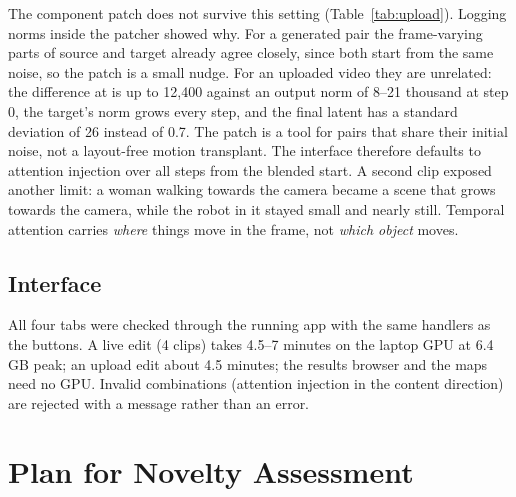 \documentclass[twoside,english]{article}
\begin{document}
The component patch does not survive this setting (Table~\ref{tab:upload}). Logging norms inside the
patcher showed why. For a generated pair the frame-varying parts of source and target already agree
closely, since both start from the same noise, so the patch is a small nudge. For an uploaded video
they are unrelated: the difference at  is up to 12{,}400 against an output norm of
8--21 thousand at step 0, the target's norm grows every step, and the final latent has a standard
deviation of 26 instead of 0.7. The patch is a tool for pairs that share their initial noise, not a
layout-free motion transplant. The interface therefore defaults to attention injection over all steps
from the blended start. A second clip exposed another limit: a woman walking towards the camera became
a scene that grows towards the camera, while the robot in it stayed small and nearly still. Temporal
attention carries \emph{where} things move in the frame, not \emph{which object} moves.

\subsection{Interface}

All four tabs were checked through the running app with the same handlers as the buttons. A live
edit (4 clips) takes 4.5--7 minutes on the laptop GPU at 6.4\,GB peak; an upload edit about 4.5 minutes;
the results browser and the maps need no GPU. Invalid combinations (attention injection in the content
direction) are rejected with a message rather than an error.

\section{Plan for Novelty Assessment} \label{sec:Plan for Novelty Assessment}
\end{document}
